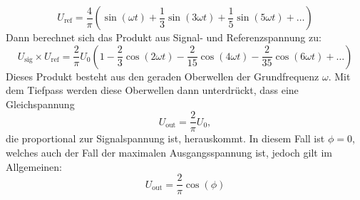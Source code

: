     \begin{equation*}
        U_{\text{ref}} = \frac{4}{\pi} \left( \sin(\omega t) + \frac{1}{3} \sin(3 \omega t ) +  \frac{1}{5} \sin(5 \omega t) + \dots \right) 
    \end{equation*}
    Dann berechnet sich das Produkt aus Signal- und Referenzspannung zu:
    \begin{equation*}
        U_{\text{sig}} \times U_{\text{ref}} = \frac{2}{\pi} U_0 \left(1 - \frac{2}{3} \cos(2 \omega t) - \frac{2}{15} \cos(4 \omega t) - \frac{2}{35} \cos(6 \omega t) + \dots \right) 
    \end{equation*}
    Dieses Produkt besteht aus den geraden Oberwellen der Grundfrequenz $\omega$. Mit dem Tiefpass werden diese Oberwellen dann unterdrückt, dass eine Gleichspannung
    \begin{equation*}
        U_{\text{out}} = \frac{2}{\pi} U_0, 
    \end{equation*}
    die proportional zur Signalspannung ist, herauskommt. In diesem Fall ist $\phi = 0$, welches auch der Fall der maximalen Ausgangsspannung ist, jedoch gilt im Allgemeinen:
    \begin{equation*}
        U_{\text{out}} = \frac{2}{\pi} \cos(\phi)
    \end{equation*}